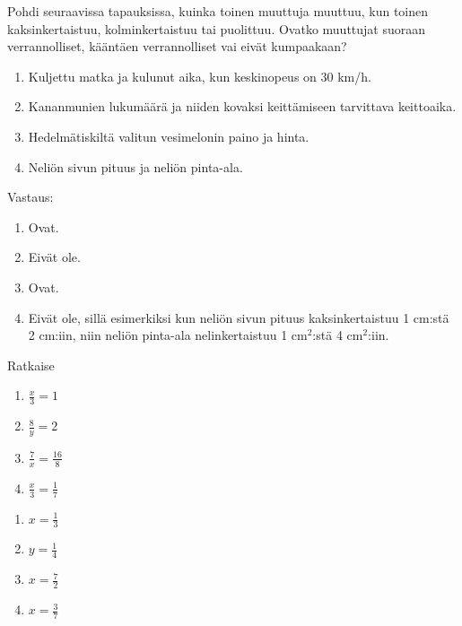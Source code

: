 \begin{tehtava}
    Pohdi seuraavissa tapauksissa, kuinka toinen muuttuja muuttuu, kun toinen
    kaksinkertaistuu, kolminkertaistuu tai puolittuu. Ovatko muuttujat
    suoraan verrannolliset, kääntäen verrannolliset vai eivät kumpaakaan?
    
    \begin{enumerate}
        \item Kuljettu matka ja kulunut aika, kun keskinopeus on 30 km/h.
        \item Kananmunien lukumäärä ja niiden kovaksi keittämiseen tarvittava keittoaika.
        \item Hedelmätiskiltä valitun vesimelonin paino ja hinta.
        \item Neliön sivun pituus ja neliön pinta-ala.
    \end{enumerate}
    
    \begin{vastaus}
        Vastaus:
        \begin{enumerate}
            \item Ovat.
            \item Eivät ole.
            \item Ovat.
            \item Eivät ole, sillä esimerkiksi kun neliön sivun pituus
                kaksinkertaistuu 1 cm:stä 2 cm:iin, niin neliön pinta-ala
                nelinkertaistuu 1 cm$^2$:stä 4 cm$^2$:iin.
        \end{enumerate}
    \end{vastaus}
\end{tehtava}

\begin{tehtava}
Ratkaise
\begin{enumerate}
\item $ \frac{x}{3} = 1$
\item $ \frac{8}{y} = 2$
\item $ \frac{7}{x} = \frac{16}{8}$
\item $ \frac{x}{3} = \frac{1}{7}$
\end{enumerate}
\begin{vastaus}
\begin{enumerate}
\item $x= \frac{1}{3}$
\item $y= \frac{1}{4}$
\item $x= \frac{7}{2}$
\item $x= \frac{3}{7}$
\end{enumerate}
\end{vastaus}
\end{tehtava}

